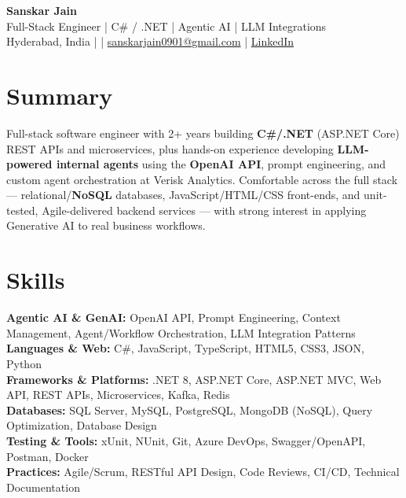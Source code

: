 \documentclass[10pt,letterpaper]{article}
\begin{document}
\begin{center}
    {\Large \textbf{Sanskar Jain}} \\
    Full-Stack Engineer \;|\; C\# / .NET \;|\; Agentic AI \;|\; LLM Integrations \\
    Hyderabad, India \enspace |  \enspace | \enspace
    \href{mailto:sanskarjain0901@gmail.com}{sanskarjain0901@gmail.com} \enspace | \enspace
    \href{https://www.linkedin.com/in/sanskar-jain0901/}{LinkedIn}
\end{center}

\vspace{2pt}

\section*{Summary}
Full-stack software engineer with 2+ years building \textbf{C\#/.NET} (ASP.NET Core) REST APIs and microservices, plus hands-on experience developing \textbf{LLM-powered internal agents} using the \textbf{OpenAI API}, prompt engineering, and custom agent orchestration at Verisk Analytics. Comfortable across the full stack --- relational/\textbf{NoSQL} databases, JavaScript/HTML/CSS front-ends, and unit-tested, Agile-delivered backend services --- with strong interest in applying Generative AI to real business workflows.

\section*{Skills}
\textbf{Agentic AI \& GenAI:} OpenAI API, Prompt Engineering, Context Management, Agent/Workflow Orchestration, LLM Integration Patterns \\
\textbf{Languages \& Web:} C\#, JavaScript, TypeScript, HTML5, CSS3, JSON, Python \\
\textbf{Frameworks \& Platforms:} .NET 8, ASP.NET Core, ASP.NET MVC, Web API, REST APIs, Microservices, Kafka, Redis \\
\textbf{Databases:} SQL Server, MySQL, PostgreSQL, MongoDB (NoSQL), Query Optimization, Database Design \\
\textbf{Testing \& Tools:} xUnit, NUnit, Git, Azure DevOps, Swagger/OpenAPI, Postman, Docker \\
\textbf{Practices:} Agile/Scrum, RESTful API Design, Code Reviews, CI/CD, Technical Documentation
\end{document}
